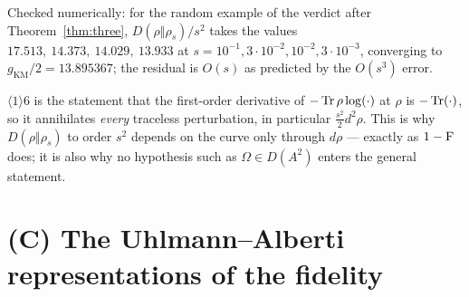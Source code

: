 \documentclass[11pt]{article}
\newcommand{\Om}{\Omega}
\newcommand{\gKM}{g_{\mathrm{KM}}}
\newcommand{\ip}[2]{\langle #1,#2\rangle}
\begin{document}
\lstep{1}{9}{$\sum_{ij}|d\rho_{ij}|^2\ell(p_i,p_j)=\ip{\eta}{\frac{\log\Delta}{\Delta-1}\eta}$.}

\begin{verdictok}
Checked numerically: for the random example of the verdict after Theorem~\ref{thm:three},
$D(\rho\Vert\rho_s)/s^2$ takes the values $17.513,\ 14.373,\ 14.029,\ 13.933$ at $s=10^{-1},3\cdot10^{-2},
10^{-2},3\cdot10^{-3}$, converging to $\gKM/2=13.895367$; the residual is $O(s)$ as predicted by the $O(s^3)$ error.
\end{verdictok}

\begin{remark}
$\langle1\rangle6$ is the statement that the first-order derivative of $-\operatorname{Tr}\rho\log(\cdot)$ at $\rho$ is
$-\operatorname{Tr}(\cdot)$, so it annihilates \emph{every} traceless perturbation, in particular $\tfrac{s^2}2d^2\rho$.
This is why $D(\rho\Vert\rho_s)$ to order $s^2$ depends on the curve only through $d\rho$ --- exactly as
$1-\operatorname{F}$ does; it is also why no hypothesis such as $\Om\in D(A^2)$ enters the general statement.
\end{remark}

\section{(C) The Uhlmann--Alberti representations of the fidelity}\label{sec:uhlmann}
\end{document}
